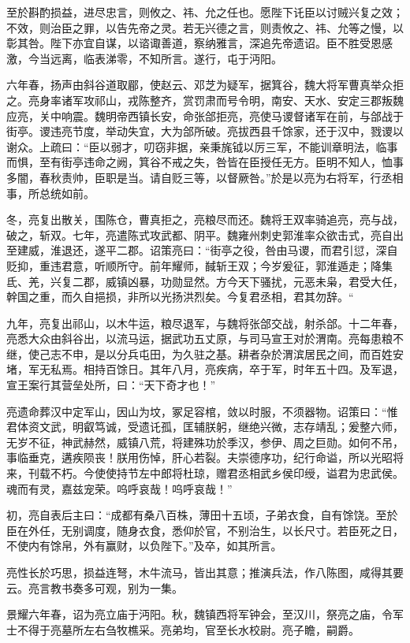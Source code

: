 \documentclass[12pt,UTF8]{ctexbook}
\begin{document}
至於斟酌损益，进尽忠言，则攸之、祎、允之任也。愿陛下讬臣以讨贼兴复之效；不效，则治臣之罪，以告先帝之灵。若无兴德之言，则责攸之、祎、允等之慢，以彰其咎。陛下亦宜自谋，以谘诹善道，察纳雅言，深追先帝遗诏。臣不胜受恩感激，今当远离，临表涕零，不知所言。遂行，屯于沔阳。

六年春，扬声由斜谷道取郿，使赵云、邓芝为疑军，据箕谷，魏大将军曹真举众拒之。亮身率诸军攻祁山，戎陈整齐，赏罚肃而号令明，南安、天水、安定三郡叛魏应亮，关中响震。魏明帝西镇长安，命张郃拒亮，亮使马谡督诸军在前，与郃战于街亭。谡违亮节度，举动失宜，大为郃所破。亮拔西县千馀家，还于汉中，戮谡以谢众。上疏曰：“臣以弱才，叨窃非据，亲秉旄钺以厉三军，不能训章明法，临事而惧，至有街亭违命之阙，箕谷不戒之失，咎皆在臣授任无方。臣明不知人，恤事多闇，春秋责帅，臣职是当。请自贬三等，以督厥咎。”於是以亮为右将军，行丞相事，所总统如前。

冬，亮复出散关，围陈仓，曹真拒之，亮粮尽而还。魏将王双率骑追亮，亮与战，破之，斩双。七年，亮遣陈式攻武都、阴平。魏雍州刺史郭淮率众欲击式，亮自出至建威，淮退还，遂平二郡。诏策亮曰：“街亭之役，咎由马谡，而君引愆，深自贬抑，重违君意，听顺所守。前年耀师，馘斩王双；今岁爰征，郭淮遁走；降集氐、羌，兴复二郡，威镇凶暴，功勋显然。方今天下骚扰，元恶未枭，君受大任，幹国之重，而久自挹损，非所以光扬洪烈矣。今复君丞相，君其勿辞。“

九年，亮复出祁山，以木牛运，粮尽退军，与魏将张郃交战，射杀郃。十二年春，亮悉大众由斜谷出，以流马运，据武功五丈原，与司马宣王对於渭南。亮每患粮不继，使己志不申，是以分兵屯田，为久驻之基。耕者杂於渭滨居民之间，而百姓安堵，军无私焉。相持百馀日。其年八月，亮疾病，卒于军，时年五十四。及军退，宣王案行其营垒处所，曰：“天下奇才也！”

亮遗命葬汉中定军山，因山为坟，冢足容棺，敛以时服，不须器物。诏策曰：“惟君体资文武，明叡笃诚，受遗讬孤，匡辅朕躬，继绝兴微，志存靖乱；爰整六师，无岁不征，神武赫然，威镇八荒，将建殊功於季汉，参伊、周之巨勋。如何不吊，事临垂克，遘疾陨丧！朕用伤悼，肝心若裂。夫崇德序功，纪行命谥，所以光昭将来，刊载不朽。今使使持节左中郎将杜琼，赠君丞相武乡侯印绶，谥君为忠武侯。魂而有灵，嘉兹宠荣。呜呼哀哉！呜呼哀哉！”

初，亮自表后主曰：“成都有桑八百株，薄田十五顷，子弟衣食，自有馀饶。至於臣在外任，无别调度，随身衣食，悉仰於官，不别治生，以长尺寸。若臣死之日，不使内有馀帛，外有赢财，以负陛下。”及卒，如其所言。

亮性长於巧思，损益连弩，木牛流马，皆出其意；推演兵法，作八陈图，咸得其要云。亮言教书奏多可观，别为一集。

景耀六年春，诏为亮立庙于沔阳。秋，魏镇西将军钟会，至汉川，祭亮之庙，令军士不得于亮墓所左右刍牧樵采。亮弟均，官至长水校尉。亮子瞻，嗣爵。
\end{document}

